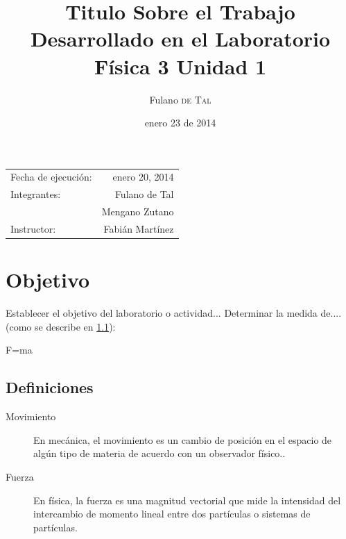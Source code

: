 \documentclass{article}
\title{Titulo Sobre el Trabajo \\ Desarrollado en el Laboratorio \\ Física 3 Unidad 1} %
\author{Fulano \textsc{de Tal}} %
\date{enero 23 de 2014} %
\begin{document}
\maketitle %

\begin{center}
\begin{tabular}{l r}
Fecha de ejecución: & enero 20, 2014 \\ %
Integrantes: & Fulano de Tal \\ %
& Mengano Zutano \\
Instructor: & Fabián Martínez %
\end{tabular}
\end{center}



\section{Objetivo}

Establecer el objetivo del laboratorio o actividad... Determinar la medida de.... (como se describe en \ref{definitiones}):\\ %

\begin{center}{F=ma}\end{center}


\subsection{Definiciones}
\label{definitiones} %
\begin{description}
\item[Movimiento]
En mecánica, el movimiento es un cambio de posición en el espacio de algún tipo de materia de acuerdo con un observador físico..
\item[Fuerza]
En física, la fuerza es una magnitud vectorial que mide la intensidad del intercambio de momento lineal entre dos partículas o sistemas de partículas.
\end{description} 
 
\end{document}
